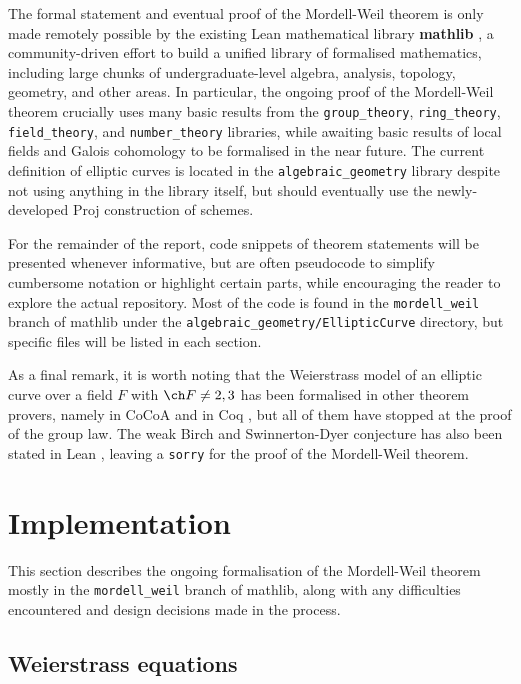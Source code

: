 The formal statement and eventual proof of the Mordell-Weil theorem is only made remotely possible by the existing Lean mathematical library \textbf{mathlib} \cite{mathlib}, a community-driven effort to build a unified library of formalised mathematics, including large chunks of undergraduate-level algebra, analysis, topology, geometry, and other areas. In particular, the ongoing proof of the Mordell-Weil theorem crucially uses many basic results from the \texttt{group\_theory}, \texttt{ring\_theory}, \texttt{field\_theory}, and \texttt{number\_theory} libraries, while awaiting basic results of local fields and Galois cohomology to be formalised in the near future. The current definition of elliptic curves is located in the \texttt{algebraic\_geometry} library despite not using anything in the library itself, but should eventually use the newly-developed Proj construction of schemes.

For the remainder of the report, code snippets of theorem statements will be presented whenever informative, but are often pseudocode to simplify cumbersome notation or highlight certain parts, while encouraging the reader to explore the actual repository. Most of the code is found in the \texttt{mordell\_weil} branch of mathlib under the \texttt{algebraic\_geometry/EllipticCurve} directory, but specific files will be listed in each section.

As a final remark, it is worth noting that the Weierstrass model of an elliptic curve over a field $ F $ with $ \ch F \ne 2, 3 $ has been formalised in other theorem provers, namely in CoCoA \cite{Fri98} and in Coq \cite{TH07} \cite{BS14}, but all of them have stopped at the proof of the group law. The weak Birch and Swinnerton-Dyer conjecture has also been stated in Lean \cite{Bel21}, leaving a \texttt{sorry} for the proof of the Mordell-Weil theorem.

\pagebreak

\section{Implementation}

This section describes the ongoing formalisation of the Mordell-Weil theorem mostly in the \texttt{mordell\_weil} branch of mathlib, along with any difficulties encountered and design decisions made in the process.

\subsection{Weierstrass equations}


